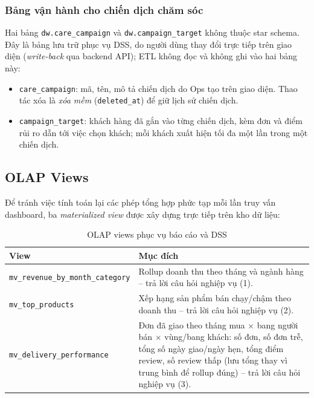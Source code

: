 \subsubsection{Bảng vận hành cho chiến dịch chăm sóc}
Hai bảng \texttt{dw.care\_campaign} và \texttt{dw.campaign\_target} không thuộc star schema.
Đây là bảng lưu trữ phục vụ DSS, do người dùng thay đổi trực tiếp trên giao diện
(\textit{write-back} qua backend API); ETL không đọc và không ghi vào hai bảng này:
\begin{itemize}
    \item \texttt{care\_campaign}: mã, tên, mô tả chiến dịch do Ops tạo trên giao diện. Thao tác
          xóa là \textit{xóa mềm} (\texttt{deleted\_at}) để giữ lịch sử chiến dịch.
    \item \texttt{campaign\_target}: khách hàng đã gắn vào từng chiến dịch, kèm đơn và điểm rủi
          ro dẫn tới việc chọn khách; mỗi khách xuất hiện tối đa một lần trong một chiến dịch.
\end{itemize}

\subsection{OLAP Views}
\hspace{1cm}
Để tránh việc tính toán lại các phép tổng hợp phức tạp mỗi lần truy vấn dashboard, ba
\textit{materialized view} được xây dựng trực tiếp trên kho dữ liệu:

\begin{table}[H]
\centering
\caption{OLAP views phục vụ báo cáo và DSS}
\begin{tabular}{@{}p{7.0cm}>{\raggedright\arraybackslash}p{9.4cm}@{}}
\toprule
\textbf{View} & \textbf{Mục đích} \\
\midrule
\texttt{mv\_revenue\_by\_\allowbreak month\_category} & Rollup doanh thu theo tháng và ngành hàng --
trả lời câu hỏi nghiệp vụ (1). \\
\texttt{mv\_top\_products} & Xếp hạng sản phẩm bán chạy/chậm theo doanh thu -- trả lời câu
hỏi nghiệp vụ (2). \\
\texttt{mv\_delivery\_performance} & Đơn đã giao theo tháng mua $\times$ bang người bán
$\times$ vùng/bang khách: số đơn, số đơn trễ, tổng số ngày giao/ngày hẹn, tổng điểm review,
số review thấp (lưu tổng thay vì trung bình để rollup đúng) -- trả lời câu hỏi nghiệp vụ (3). \\
\bottomrule
\end{tabular}
\end{table}

